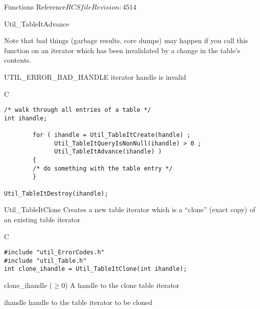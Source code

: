 \begin{cactuspart}{ Functions Reference}{$RCSfile$}{$Revision: 4514 $}
\begin{FunctionDescription}{Util\_TableItAdvance}
\begin{Discussion}
Note that bad things (garbage results, core dumps) may happen if
you call this function on an iterator which has been invalidated
by a change in the table's contents.
\end{Discussion}

\begin{ErrorSection}
\begin{Error}{UTIL\_ERROR\_BAD\_HANDLE}
iterator handle is invalid
\end{Error}
\end{ErrorSection}

\begin{ExampleSection}
\begin{Example}{C}
\begin{verbatim}
/* walk through all entries of a table */
int ihandle;

        for ( ihandle = Util_TableItCreate(handle) ;
              Util_TableItQueryIsNonNull(ihandle) > 0 ;
              Util_TableItAdvance(ihandle) )
        {
        /* do something with the table entry */
        }

Util_TableItDestroy(ihandle);
\end{verbatim}
\end{Example}
\end{ExampleSection}
\end{FunctionDescription}


\begin{FunctionDescription}{Util\_TableItClone}
\label{Util-TableItClone}
Creates a new table iterator which is a ``clone'' (exact copy) of an
existing table iterator

\begin{SynopsisSection}
\begin{Synopsis}{C}
\begin{verbatim}
#include "util_ErrorCodes.h"
#include "util_Table.h"
int clone_ihandle = Util_TableItClone(int ihandle);
\end{verbatim}
\end{Synopsis}
\end{SynopsisSection}

\begin{ResultSection}
\begin{Result}{clone\_ihandle ($\ge 0$)}
A handle to the clone table iterator
\end{Result}
\end{ResultSection}

\begin{ParameterSection}
\begin{Parameter}{ihandle}
handle to the table iterator to be cloned
\end{Parameter}
\end{ParameterSection}


\end{FunctionDescription}
\end{cactuspart}
